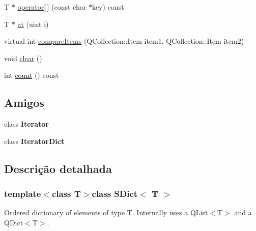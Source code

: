 \begin{DoxyCompactItemize}
\item 
T $\ast$ \hyperlink{class_s_dict_a0d7ef1c67469eac9fec3a1050d8393d5}{operator\mbox{[}$\,$\mbox{]}} (const char $\ast$key) const 
\item 
T $\ast$ \hyperlink{class_s_dict_a6ee1dd34abf45188298cd760033ba59c}{at} (uint i)
\item 
virtual int \hyperlink{class_s_dict_aade9045d8c0047e0427d8c6a9c048985}{compare\-Items} (Q\-Collection\-::\-Item item1, Q\-Collection\-::\-Item item2)
\item 
void \hyperlink{class_s_dict_ac8bb3912a3ce86b15842e79d0b421204}{clear} ()
\item 
int \hyperlink{class_s_dict_a0745638c9967e2ed90bc96c012288c55}{count} () const 
\end{DoxyCompactItemize}
\subsection*{Amigos}
\begin{DoxyCompactItemize}
\item 
\hypertarget{class_s_dict_a9830fc407400559db7e7783cc10a9394}{class {\bfseries Iterator}}\label{class_s_dict_a9830fc407400559db7e7783cc10a9394}

\item 
\hypertarget{class_s_dict_ab362b5ead75b40c212098db068d50ac7}{class {\bfseries Iterator\-Dict}}\label{class_s_dict_ab362b5ead75b40c212098db068d50ac7}

\end{DoxyCompactItemize}


\subsection{Descrição detalhada}
\subsubsection*{template$<$class T$>$class S\-Dict$<$ T $>$}

Ordered dictionary of elements of type T. Internally uses a \hyperlink{class_q_list}{Q\-List$<$\-T$>$} and a Q\-Dict$<$\-T$>$. 

